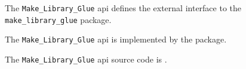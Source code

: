 The {\tt Make\_Library\_Glue} api defines the external interface to the {\tt make\_library\_glue} package.

The {\tt Make\_Library\_Glue} api is implemented by the  package.

The {\tt Make\_Library\_Glue} api source code is .

